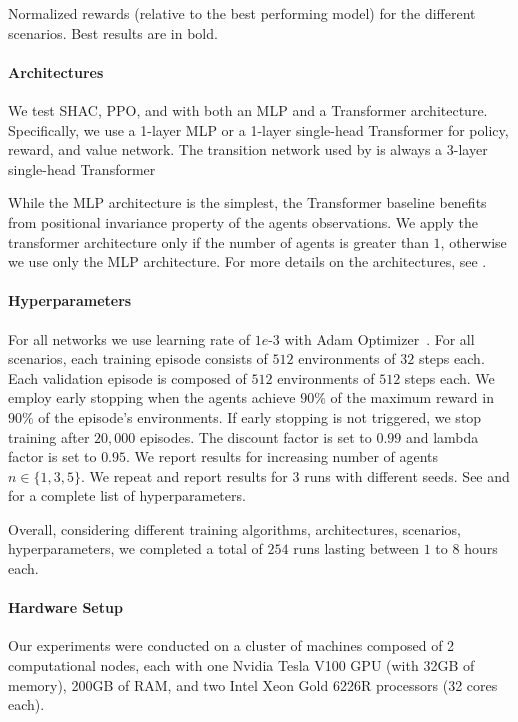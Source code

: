 \begin{table}[!t]
    \centering
    
    \caption{Normalized rewards (relative to the best performing model) for the different scenarios. Best results are in bold.}\label{tab:max-rewards}
\end{table}

\paragraph{Architectures}
We test SHAC, PPO, and \fname{} with both an MLP and a Transformer architecture. Specifically, we use a 1-layer MLP or a 1-layer single-head Transformer for policy, reward, and value network. The transition network used by \fname{} is always a 3-layer single-head Transformer

While the MLP architecture is the simplest, the Transformer baseline benefits from positional invariance property of the agents observations. We apply the transformer architecture only if the number of agents is greater than $1$, otherwise we use only the MLP architecture. For more details on the architectures, see .

\paragraph{Hyperparameters}
For all networks we use learning rate of $1e\text{-}3$ with Adam Optimizer~\cite{Kingma14}. For all scenarios, each training episode consists of $512$ environments of $32$ steps each. Each validation episode is composed of $512$ environments of $512$ steps each. We employ early stopping when the agents achieve $90\%$ of the maximum reward in $90\%$ of the episode's environments. If early stopping is not triggered, we stop training after $20,000$ episodes. The discount factor is set to $0.99$ and lambda factor is set to $0.95$. We report results for increasing number of agents $n\in\{1,3,5\}$. We repeat and report results for $3$ runs with different seeds. See  and  for a complete list of hyperparameters.

Overall, considering different training algorithms, architectures, scenarios, hyperparameters, we completed a total of $254$ runs lasting between $1$ to $8$ hours each. 

\paragraph{Hardware Setup}
Our experiments were conducted on a cluster of machines composed of 2 computational nodes, each with one Nvidia Tesla V100 GPU (with 32GB of memory), 200GB of RAM, and two Intel Xeon Gold 6226R processors (32 cores each).

